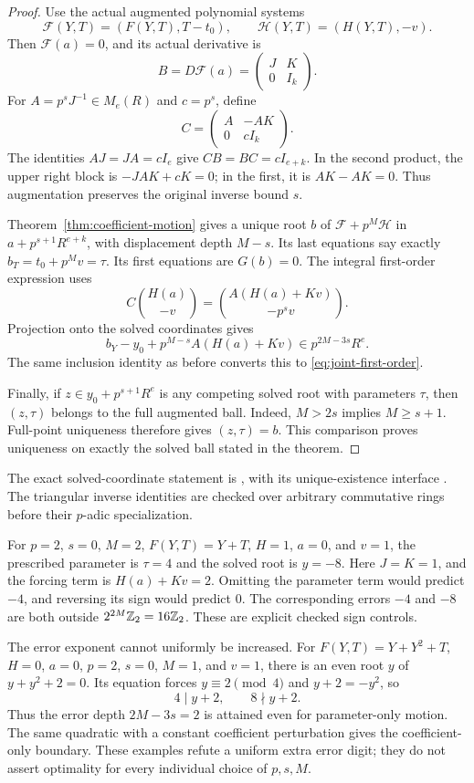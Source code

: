 \begin{proof}
Use the actual augmented polynomial systems
\[
 \mathcal F(Y,T)=(F(Y,T),T-t_0),\qquad
 \mathcal H(Y,T)=(H(Y,T),-v).
\]
Then $\mathcal F(a)=0$, and its actual derivative is
\[
 B=D\mathcal F(a)=\begin{pmatrix}J&K\\0&I_k\end{pmatrix}.
\]
For $A=p^sJ^{-1}\in M_e(R)$ and $c=p^s$, define
\[
 C=\begin{pmatrix}A&-AK\\0&cI_k\end{pmatrix}.
\]
The identities $AJ=JA=cI_e$ give $CB=BC=cI_{e+k}$. In the second
product, the upper right block is $-JAK+cK=0$; in the first, it is
$AK-AK=0$. Thus augmentation preserves the original inverse bound $s$.

Theorem~\ref{thm:coefficient-motion} gives a unique root $b$ of
$\mathcal F+p^M\mathcal H$ in $a+p^{s+1}R^{e+k}$, with displacement
depth $M-s$. Its last equations say exactly
$b_T=t_0+p^Mv=\tau$. Its first equations are $G(b)=0$.
The integral first-order expression uses
\[
 C\binom{H(a)}{-v}
 =\binom{A(H(a)+Kv)}{-p^sv}.
\]
Projection onto the solved coordinates gives
\[
 b_Y-y_0+p^{M-s}A(H(a)+Kv)\in p^{2M-3s}R^e.
\]
The same inclusion identity as before converts this to
\eqref{eq:joint-first-order}.

Finally, if $z\in y_0+p^{s+1}R^e$ is any competing solved root with
parameters $\tau$, then $(z,\tau)$ belongs to the full augmented ball.
Indeed, $M>2s$ implies $M\ge s+1$. Full-point uniqueness therefore gives
$(z,\tau)=b$. This comparison proves uniqueness on exactly the solved
ball stated in the theorem.
\end{proof}

The exact solved-coordinate statement is
,
with its unique-existence interface
.
The triangular inverse identities are checked over arbitrary commutative
rings before their $p$-adic specialization.

\begin{example}\label{ex:motion-boundary}
For $p=2$, $s=0$, $M=2$, $F(Y,T)=Y+T$, $H=1$, $a=0$, and $v=1$,
the prescribed parameter is $\tau=4$ and the solved root is $y=-8$.
Here $J=K=1$, and the forcing term is $H(a)+Kv=2$. Omitting the parameter
term would predict $-4$, and reversing its sign would predict $0$.
The corresponding errors $-4$ and $-8$ are both outside
$2^{2M}\mathbb Z_2=16\mathbb Z_2$. These are explicit checked sign controls.

The error exponent cannot uniformly be increased. For
$F(Y,T)=Y+Y^2+T$, $H=0$, $a=0$, $p=2$, $s=0$, $M=1$, and $v=1$,
there is an even root $y$ of $y+y^2+2=0$. Its equation forces
$y\equiv2\pmod4$ and $y+2=-y^2$, so
\[
 4\mid y+2,\qquad 8\nmid y+2.
\]
Thus the error depth $2M-3s=2$ is attained even for parameter-only motion.
The same quadratic with a constant coefficient perturbation gives the
coefficient-only boundary. These examples refute a uniform extra error
digit; they do not assert optimality for every individual choice of
$p,s,M$.
\end{example}

